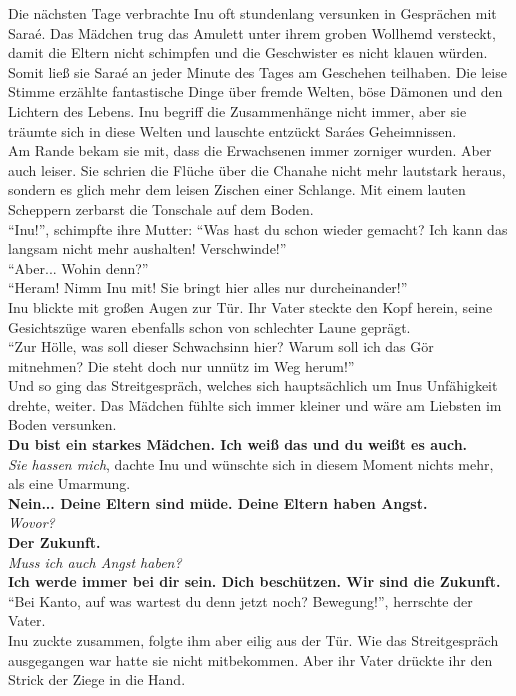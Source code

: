 Die nächsten Tage verbrachte Inu oft stundenlang versunken in Gesprächen mit Saraé. Das Mädchen 
trug das Amulett unter ihrem groben Wollhemd versteckt, damit die Eltern nicht schimpfen und die 
Geschwister es nicht klauen würden. Somit ließ sie Saraé an jeder Minute des Tages am Geschehen 
teilhaben. Die leise Stimme erzählte fantastische Dinge über fremde Welten, böse Dämonen und den 
Lichtern des Lebens. Inu begriff die Zusammenhänge nicht immer, aber sie träumte sich in diese 
Welten und lauschte entzückt Saráes Geheimnissen.\\
Am Rande bekam sie mit, dass die Erwachsenen immer zorniger wurden. Aber auch leiser. Sie schrien 
die Flüche über die Chanahe nicht mehr lautstark heraus, sondern es glich mehr dem leisen Zischen 
einer Schlange. Mit einem lauten Scheppern zerbarst die Tonschale auf dem Boden.\\
``Inu!'', schimpfte ihre Mutter: ``Was hast du schon wieder gemacht? Ich kann das langsam nicht 
mehr aushalten! Verschwinde!''\\
``Aber... Wohin denn?''\\
``Heram! Nimm Inu mit! Sie bringt hier alles nur durcheinander!''\\
Inu blickte mit großen Augen zur Tür. Ihr Vater steckte den Kopf herein, seine Gesichtszüge waren 
ebenfalls schon von schlechter Laune geprägt.\\
``Zur Hölle, was soll dieser Schwachsinn hier? Warum soll ich das Gör mitnehmen? Die steht doch nur 
unnütz im Weg herum!''\\
Und so ging das Streitgespräch, welches sich hauptsächlich um Inus Unfähigkeit drehte, weiter. Das 
Mädchen fühlte sich immer kleiner und wäre am Liebsten im Boden versunken.\\
\textbf{Du bist ein starkes Mädchen. Ich weiß das und du weißt es auch.}\\
\textit{Sie hassen mich}, dachte Inu und wünschte sich in diesem Moment nichts mehr, als eine 
Umarmung.\\
\textbf{Nein... Deine Eltern sind müde. Deine Eltern haben Angst.}\\
\textit{Wovor?}\\
\textbf{Der Zukunft.}\\
\textit{Muss ich auch Angst haben?}\\
\textbf{Ich werde immer bei dir sein. Dich beschützen. Wir sind die Zukunft.}\\
``Bei Kanto, auf was wartest du denn jetzt noch? Bewegung!'', herrschte der Vater.\\
Inu zuckte zusammen, folgte ihm aber eilig aus der Tür. Wie das Streitgespräch ausgegangen war 
hatte sie nicht mitbekommen. Aber ihr Vater drückte ihr den Strick der Ziege in die Hand. \\



